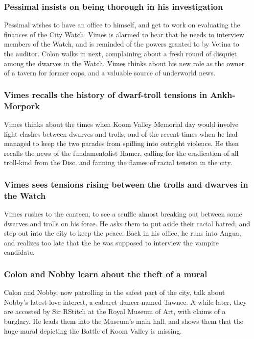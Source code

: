 \subsubsection{\Gls{Pessimal} insists on being thorough in his investigation}
\Gls{Pessimal} wishes to have an office to himself, and get to work on evaluating the finances of
the City Watch. \Gls{Vimes} is alarmed to hear that he needs to interview members of the Watch, and
is reminded of the powers granted to by \Gls{Vetina} to the auditor. \Gls{Colon} walks in next,
complaining about a fresh round of disquiet among the dwarves in the Watch. \Gls{Vimes} thinks about
his new role as the owner of a tavern for former cops, and a valuable source of underworld news.

\subsubsection{\Gls{Vimes} recalls the history of dwarf-troll tensions in Ankh-Morpork}
\Gls{Vimes} thinks about the times when Koom Valley Memorial day would involve light clashes
between dwarves and trolls, and of the recent times when he had managed to keep the two parades
from spilling into outright violence. He then recalls the news of the fundamentalist \Gls{Hamcr},
calling for the eradication of all troll-kind from the Disc, and fanning the flames of racial
tension in the city.

\subsubsection{\Gls{Vimes} sees tensions rising between the trolls and dwarves in the Watch}
\Gls{Vimes} rushes to the canteen, to see a scuffle almost breaking out between some dwarves and
trolls on his force. He asks them to put aside their racial hatred, and step out into the city to
keep the peace. Back in his office, he runs into \Gls{Angua}, and realizes too late that the he
was supposed to interview the vampire candidate.

\subsubsection{\Gls{Colon} and \Gls{Nobby} learn about the theft of a mural}
\Gls{Colon} and \Gls{Nobby}, now patrolling in the safest part of the city, talk about \Gls{Nobby}'s
latest love interest, a cabaret dancer named \Gls{Tawnee}. A while later, they are accosted by
Sir \Gls{RStitch} at the Royal Museum of Art, with claims of a burglary. He leads them into the
Museum's main hall, and shows them that the huge mural depicting the Battle of Koom Valley is
missing.

